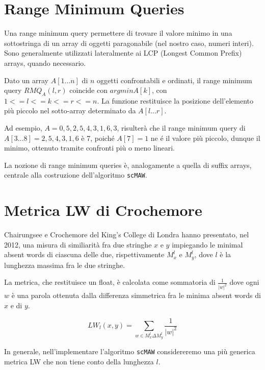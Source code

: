 \section{Range Minimum Queries}

Una range minimum query \cite{RMQ} permettere di trovare il valore minimo in una sottostringa di un array di oggetti paragonabile (nel nostro caso, numeri interi). Sono generalmente utilizzati lateralmente ai LCP (Longest Common Prefix) arrays, quando necessario.

\vspace{3mm}

Dato un array $A[1...n]$ di $n$ oggetti confrontabili e ordinati, il range minimum query $RMQ_A (l,r)$ coincide con $arg min A[k]$, con $1<=l<=k<=r<=n$. La funzione restituisce la posizione dell'elemento più piccolo nel sotto-array determinato da $A[l...r]$. 

\vspace{3mm}

Ad esempio, $A=0,5,2,5,4,3,1,6,3$, risulterà che il range minimum query di $A[3...8]=2,5,4,3,1,6$ è 7, poiché $A[7]=1$ ne é il valore più piccolo, dunque il minimo, ottenuto tramite confronti più o meno lineari.

\vspace{3mm}

La nozione di range minimum queries è, analogamente a quella di suffix arrays, centrale alla costruzione dell'algoritmo \verb|scMAW|.

\section{Metrica LW di Crochemore}

Chairungsee e Crochemore del King's College di Londra hanno presentato, nel 2012, una misura di similiarità fra due stringhe $x$ e $y$ impiegando le minimal absent words \cite{CHAIRUNGSEE2012109} di ciascuna delle due, rispettivamente $M^l_x$ e $M^l_y$, dove $l$ è la lunghezza massima fra le due stringhe.

\vspace{3mm}

La metrica, che restituisce un float, è calcolata come sommatoria di $\frac{1}{|w|^2}$ dove ogni $w$ è una parola ottenuta dalla differenza simmetrica fra le minima absent words di $x$ e di $y$.

\[LW_l (x, y)=\sum_{w \in M^l_x \Delta M^l_y} \frac{1}{|w|^2 }\]

In generale, nell'implementare l'algoritmo \verb|scMAW| considereremo una più generica metrica LW che non tiene conto della lunghezza $l$.

